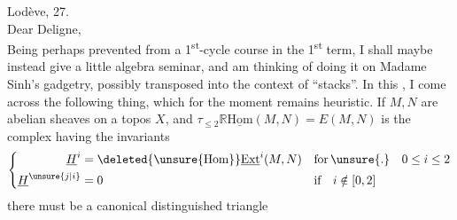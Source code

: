 
\noindent\hfill Lodève, 27.\\
Dear Deligne,\\
Being perhaps prevented   from  a 1\textsuperscript{st}-cycle course in the 1\textsuperscript{st} term, I shall maybe instead give a little algebra seminar, and am thinking of doing it on Madame Sinh's gadgetry, possibly transposed into the context of ``stacks''. In this , I come across the following thing, which for the moment remains heuristic. If $M,N$ are  abelian sheaves on a topos $X$, and $\tau_{\leq 2}\mathbb{R}\underline{\mathrm{Hom}}(M,N)=E(M,N)$ is the complex having the invariants
\[
\left\{\begin{aligned}
\underline{H}^{i} &= \deleted{\unsure{\mathrm{Hom}}}\underline{\mathrm{Ext}}^{i}(M,N) && \text{for}\,\unsure{.}\quad 0\leq i\leq 2\\
\underline{H}^{\unsure{j|i}} &= 0 && \text{if}\quad i\notin[0,2]
\end{aligned}\right.
\]
there must be a canonical distinguished triangle

